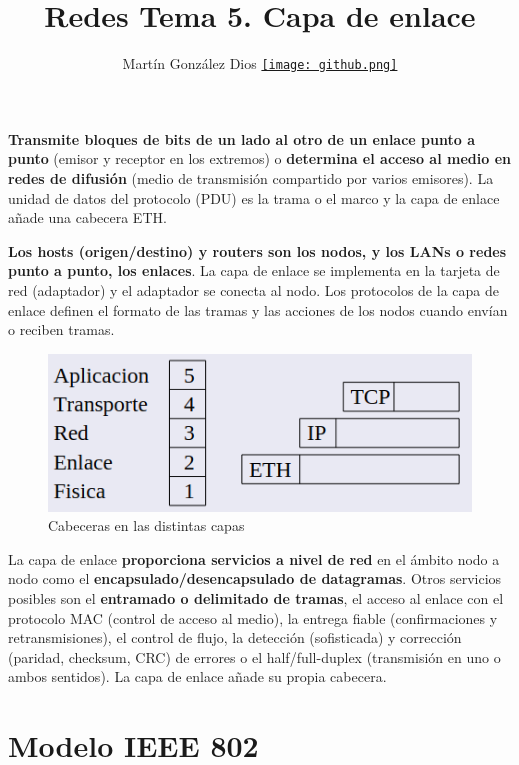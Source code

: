 \documentclass{article}
\title{Redes Tema 5. Capa de enlace}
\author{Martín González Dios 
\href{https://github.com/martindios}{\texttt{[image: github.png]}}}
\begin{document}
\maketitle

\textbf{Transmite bloques de bits de un lado al otro de un enlace punto a punto }(emisor y receptor en los extremos) o \textbf{determina el acceso al medio en redes de difusión} (medio de transmisión compartido por varios emisores). La unidad de datos del protocolo (PDU) es la trama o el marco y la capa de enlace añade una cabecera ETH. 

\textbf{Los hosts (origen/destino) y routers son los nodos, y los LANs o redes punto a punto, los enlaces}. La capa de enlace se implementa en la tarjeta de red (adaptador) y el adaptador se conecta al nodo. Los protocolos de la capa de enlace definen el formato de las tramas y las acciones de los nodos cuando envían o reciben tramas. \\


\begin{figure}
    \centering
    \includegraphics[width=0.8\linewidth]{img-t5/img_972_54.png}
    \caption{Cabeceras en las distintas capas}
\end{figure}

La capa de enlace \textbf{proporciona servicios a nivel de red} en el ámbito nodo a nodo como el
\textbf{encapsulado/desencapsulado de datagramas}. Otros servicios posibles son el \textbf{entramado o delimitado de tramas}, el acceso al enlace con el protocolo MAC (control de acceso al medio), la entrega fiable (confirmaciones y retransmisiones), el control de flujo, la detección (sofisticada) y corrección (paridad, checksum, CRC) de errores o el half/full-duplex (transmisión en uno o ambos sentidos). La capa de enlace añade su propia cabecera.

\section{Modelo IEEE 802}
\end{document}
